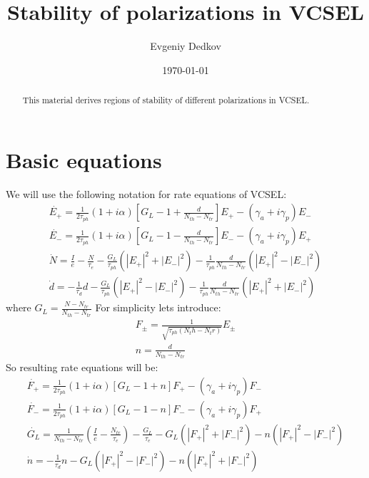 \documentclass[12pt, notitlepage]{report}
\title{Stability of polarizations in VCSEL}
\author{Evgeniy Dedkov}
\date{\today}
\begin{document}
	
	\newcommand\scalemath[2]{\scalebox{#1}{\mbox{\ensuremath{\displaystyle #2}}}}
	
	\maketitle
	\thispagestyle{empty}
	
	\begin{abstract}
		This material derives regions of stability of different polarizations in VCSEL.
	\end{abstract}
	
	\section{Basic equations}
	We will use the following notation for rate equations of VCSEL:
	\begin{gather}
		\dot{E_+} = \frac{1}{2\tau_{ph}}(1+i\alpha)\left[G_L - 1+ \frac{d}{N_{th} - N_{tr}}\right] E_+ - (\gamma_a + i\gamma_p) E_- \\
		\dot{E_-} = \frac{1}{2\tau_{ph}}(1+i\alpha)\left[G_L - 1- \frac{d}{N_{th} - N_{tr}}\right] E_- - (\gamma_a + i\gamma_p) E_+ \\
		\dot{N} = \frac{I}{e} - \frac{N}{\tau_e} - \frac{G_L}{\tau_{ph}}(|E_+|^2+|E_-|^2) - \frac{1}{\tau_{ph}}\frac{d}{N_{th} - N_{tr}}(|E_+|^2 - |E_-|^2)\\
		\dot{d} = -\frac{1}{\tau_d} d -  \frac{G_L}{\tau_{ph}}(|E_+|^2-|E_-|^2) - \frac{1}{\tau_{ph}}\frac{d}{N_{th} - N_{tr}}(|E_+|^2+|E_-|^2)
	\end{gather}
	where $G_L = \frac{N - N_{tr}}{N_{th} - N_{tr}}$
	For simplicity lets introduce:
	\begin{gather}
		F_\pm = \frac{1}{\sqrt{\tau_{ph}(N_th - N_tr)}}E_\pm \\
		n = \frac{d}{N_{th} - N_{tr}}
	\end{gather}
	So resulting rate equations will be:
	\begin{gather}
		\dot{F_+} = \frac{1}{2\tau_{ph}}(1+i\alpha)\left[G_L - 1+ n\right] F_+ - (\gamma_a + i\gamma_p) F_- \\
		\dot{F_-} = \frac{1}{2\tau_{ph}}(1+i\alpha)\left[G_L - 1- n\right] F_- - (\gamma_a + i\gamma_p) F_+ \\
		\dot{G_L} = \frac{1}{N_{th}-N_{tr}} (\frac{I}{e} - \frac{N_{tr}}{\tau_e} ) - \frac{G_L}{\tau_e} - G_L(|F_+|^2+|F_-|^2) - n(|F_+|^2 - |F_-|^2) \\
		\dot{n} = -\frac{1}{\tau_d} n - G_L(|F_+|^2-|F_-|^2) - n(|F_+|^2+|F_-|^2)
	\end{gather}
\end{document}
